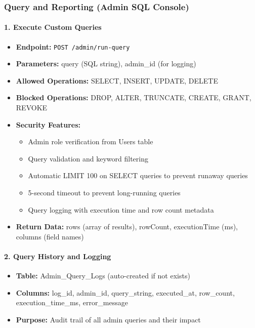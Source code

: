 \documentclass[12pt]{article}
\begin{document}
\subsubsection{Query and Reporting (Admin SQL Console)}

\paragraph{1. Execute Custom Queries}
\begin{itemize}
    \item \textbf{Endpoint:} \texttt{POST /admin/run-query}
    \item \textbf{Parameters:} query (SQL string), admin\_id (for logging)
    \item \textbf{Allowed Operations:} SELECT, INSERT, UPDATE, DELETE
    \item \textbf{Blocked Operations:} DROP, ALTER, TRUNCATE, CREATE, GRANT, REVOKE
    \item \textbf{Security Features:}
        \begin{itemize}
            \item Admin role verification from Users table
            \item Query validation and keyword filtering
            \item Automatic LIMIT 100 on SELECT queries to prevent runaway queries
            \item 5-second timeout to prevent long-running queries
            \item Query logging with execution time and row count metadata
        \end{itemize}
    \item \textbf{Return Data:} rows (array of results), rowCount, executionTime (ms), columns (field names)
\end{itemize}

\paragraph{2. Query History and Logging}
\begin{itemize}
    \item \textbf{Table:} Admin\_Query\_Logs (auto-created if not exists)
    \item \textbf{Columns:} log\_id, admin\_id, query\_string, executed\_at, row\_count, execution\_time\_ms, error\_message
    \item \textbf{Purpose:} Audit trail of all admin queries and their impact
\end{itemize}
\end{document}
